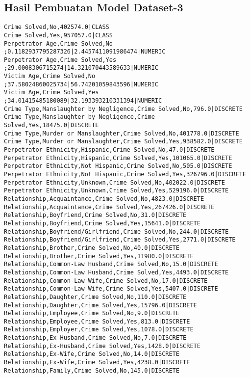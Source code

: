\subsection{Hasil Pembuatan Model Dataset-3}
\label{lamp:E-Hasil Pembuatan Model Dataset-3}
\begin{lstlisting}
Crime Solved,No,402574.0|CLASS	
Crime Solved,Yes,957057.0|CLASS	
Perpetrator Age,Crime Solved,No	;0.1182937795287326|2.4457411091986474|NUMERIC
Perpetrator Age,Crime Solved,Yes	;29.0008306715274|14.321070443589633|NUMERIC
Victim Age,Crime Solved,No	;37.58024860025734|56.74201059843596|NUMERIC
Victim Age,Crime Solved,Yes	;34.01415485180089|32.193393210331394|NUMERIC
Crime Type,Manslaughter by Negligence,Crime Solved,No,796.0|DISCRETE	
Crime Type,Manslaughter by Negligence,Crime Solved,Yes,18475.0|DISCRETE	
Crime Type,Murder or Manslaughter,Crime Solved,No,401778.0|DISCRETE	
Crime Type,Murder or Manslaughter,Crime Solved,Yes,938582.0|DISCRETE	
Perpetrator Ethnicity,Hispanic,Crime Solved,No,47.0|DISCRETE	
Perpetrator Ethnicity,Hispanic,Crime Solved,Yes,101065.0|DISCRETE	
Perpetrator Ethnicity,Not Hispanic,Crime Solved,No,505.0|DISCRETE	
Perpetrator Ethnicity,Not Hispanic,Crime Solved,Yes,326796.0|DISCRETE	
Perpetrator Ethnicity,Unknown,Crime Solved,No,402022.0|DISCRETE	
Perpetrator Ethnicity,Unknown,Crime Solved,Yes,529196.0|DISCRETE	
Relationship,Acquaintance,Crime Solved,No,4823.0|DISCRETE	
Relationship,Acquaintance,Crime Solved,Yes,267426.0|DISCRETE	
Relationship,Boyfriend,Crime Solved,No,31.0|DISCRETE	
Relationship,Boyfriend,Crime Solved,Yes,15641.0|DISCRETE	
Relationship,Boyfriend/Girlfriend,Crime Solved,No,244.0|DISCRETE	
Relationship,Boyfriend/Girlfriend,Crime Solved,Yes,2771.0|DISCRETE	
Relationship,Brother,Crime Solved,No,40.0|DISCRETE	
Relationship,Brother,Crime Solved,Yes,11980.0|DISCRETE	
Relationship,Common-Law Husband,Crime Solved,No,15.0|DISCRETE	
Relationship,Common-Law Husband,Crime Solved,Yes,4493.0|DISCRETE	
Relationship,Common-Law Wife,Crime Solved,No,17.0|DISCRETE	
Relationship,Common-Law Wife,Crime Solved,Yes,5407.0|DISCRETE	
Relationship,Daughter,Crime Solved,No,110.0|DISCRETE	
Relationship,Daughter,Crime Solved,Yes,15796.0|DISCRETE	
Relationship,Employee,Crime Solved,No,9.0|DISCRETE	
Relationship,Employee,Crime Solved,Yes,813.0|DISCRETE	
Relationship,Employer,Crime Solved,Yes,1078.0|DISCRETE	
Relationship,Ex-Husband,Crime Solved,No,7.0|DISCRETE	
Relationship,Ex-Husband,Crime Solved,Yes,1428.0|DISCRETE	
Relationship,Ex-Wife,Crime Solved,No,14.0|DISCRETE	
Relationship,Ex-Wife,Crime Solved,Yes,4238.0|DISCRETE	
Relationship,Family,Crime Solved,No,145.0|DISCRETE	

\end{lstlisting}
